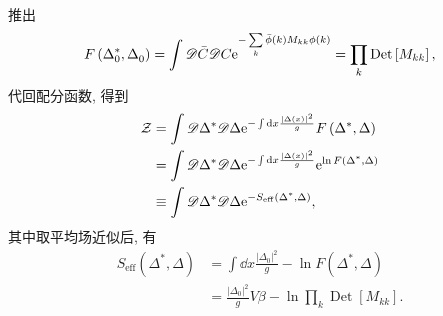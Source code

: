 推出
\begin{equation}
 F\left(\Delta_{0}^{*}, \Delta^{}_{0}\right)=\int \mathscr{D} \bar{C} \mathscr{D} C \mathrm{e}^{-\sum\limits_{k} \bar{\phi}(k) M_{kk} \phi({k})}=\prod_{k} \operatorname{Det}\left[M_{k k}\right],
\end{equation}
代回配分函数, 得到
\begin{align}
\mathcal Z &=\int \mathscr{D} \Delta^{*}  \mathscr{D} \Delta \mathrm{e}^{-\int \mathrm{d} x \frac{|\Delta(x)|^2}{g}} F\left(\Delta^{*}, \Delta\right) \nonumber\\
&=\int  \mathscr{D} \Delta^{*} \mathscr{D} \Delta \mathrm{e}^{-\int \mathrm{d} x \frac{|\Delta (x)|^{2}}{g}} \mathrm{e}^{\ln F\left(\Delta^{*} , \Delta\right)}\nonumber \\
&\equiv\int  \mathscr{D} \Delta^{*} \mathscr{D} \Delta \mathrm{e}^{- S_{\operatorname{eff}}\left(\Delta^{*}, \Delta\right)}, 
\end{align}
其中取平均场近似后, 有
\begin{align}
 S_{\operatorname{eff}}\left(\Delta^{*}, \Delta\right)&=\int \dd x \frac{|\Delta_0|^{2}}{g}-\ln F\left(\Delta^{*}, \Delta\right)  \nonumber\\
& =\frac{|\Delta_0|^{2}}{g} V \beta-\ln \prod_{k} \operatorname{Det}\left[M_{k k}\right] .
\end{align}


